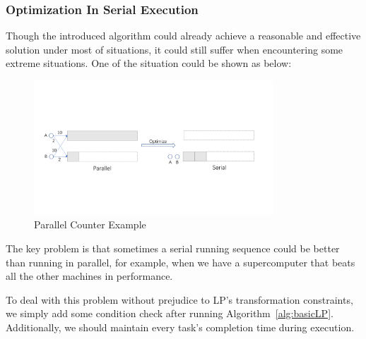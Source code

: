 \documentclass{llncs}
\begin{document}
\subsubsection{Optimization In Serial Execution}
Though the introduced algorithm could already achieve a reasonable and effective solution under most of situations, it could still suffer when encountering some extreme situations. One of the situation could be shown as below:
\begin{figure}[htbp]
    \centering
    \includegraphics[width=0.8\textwidth]{Figures/CounterExample.pdf}
    \caption{Parallel Counter Example}
    \label{fig:CounterExp}
\end{figure}

The key problem is that sometimes a serial running sequence could be better than running in parallel, for example, when we have a supercomputer that beats all the other machines in performance.

To deal with this problem without prejudice to LP's transformation constraints, we simply add some condition check after running Algorithm~\ref{alg:basicLP}. Additionally, we should maintain every task's completion time during execution.
\end{document}
